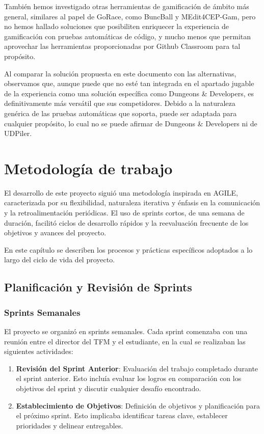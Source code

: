 También hemos investigado otras herramientas de gamificación de ámbito más general, similares al papel de GoRace, como BuncBall\cite{biworldwideAboutBunchball} y MEdit4CEP-Gam\cite{MEdit4CEP-Gam}, pero no hemos hallado soluciones que posibiliten enriquecer la experiencia de gamificación con pruebas automáticas de código, y mucho menos que permitan aprovechar las herramientas proporcionadas por Github Classroom para tal propósito.

Al comparar la solución propuesta en este documento con las alternativas, observamos que, aunque puede que no esté tan integrada en el apartado jugable de la experiencia como una solución específica como Dungeons \& Developers, es definitivamente más versátil que sus competidores. Debido a la naturaleza genérica de las pruebas automáticas que soporta, puede ser adaptada para cualquier propósito, lo cual no se puede afirmar de Dungeons \& Developers ni de UDPiler.

\section{Metodología de trabajo}
El desarrollo de este proyecto siguió una metodología inspirada en AGILE, caracterizada por su flexibilidad, naturaleza iterativa y énfasis en la comunicación y la retroalimentación periódicas. El uso de sprints cortos, de una semana de duración, facilitó ciclos de desarrollo rápidos y la reevaluación frecuente de los objetivos y avances del proyecto.

En este capítulo se describen los procesos y prácticas específicos adoptados a lo largo del ciclo de vida del proyecto.
\subsection{Planificación y Revisión de Sprints}

\subsubsection{Sprints Semanales}
El proyecto se organizó en sprints semanales. Cada sprint comenzaba con una reunión entre el director del \acrshort{TFM} y el estudiante, en la cual se realizaban las siguientes actividades:

\begin{enumerate}
    \item \textbf{Revisión del Sprint Anterior}: Evaluación del trabajo completado durante el sprint anterior. Esto incluía evaluar los logros en comparación con los objetivos del sprint y discutir cualquier desafío encontrado.
    \item \textbf{Establecimiento de Objetivos}: Definición de objetivos y planificación para el próximo sprint. Esto implicaba identificar tareas clave, establecer prioridades y delinear entregables.
\end{enumerate}

